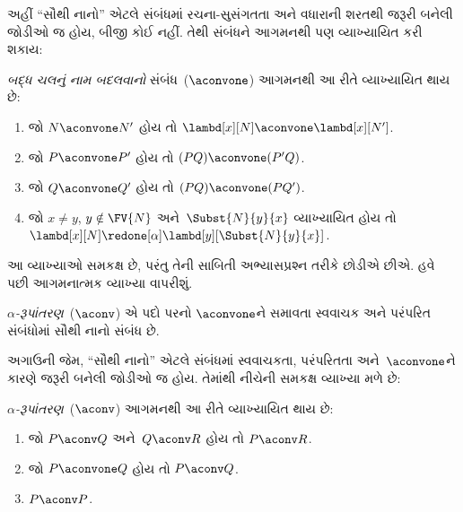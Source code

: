 અહીં ``સૌથી નાનો'' એટલે સંબંધમાં રચના-સુસંગતતા અને વધારાની
શરતથી જરૂરી બનેલી જોડીઓ જ હોય, બીજી કોઈ નહીં. તેથી સંબંધને
આગમનથી પણ વ્યાખ્યાયિત કરી શકાય:

\begin{defn} 
  \emph{બદ્ધ ચલનું નામ બદલવાનો} સંબંધ~($\aconvone$)
  આગમનથી આ રીતે વ્યાખ્યાયિત થાય છે:
  \begin{enumerate}
  \item જો $N \aconvone N'$ હોય તો $\lambd[x][N] \aconvone
    \lambd[x][N']$. 
  \item જો $P \aconvone P'$ હોય તો $(PQ) \aconvone (P'Q)$.
  \item જો $Q \aconvone Q'$ હોય તો $(PQ) \aconvone (PQ')$.
  \item જો $x \neq y$, $y \notin \FV{N}$ અને~$\Subst{N}{y}{x}$
    વ્યાખ્યાયિત હોય તો
    $\lambd[x][N] \redone[\alpha] \lambd[y][\Subst{N}{y}{x}]$.
  \end{enumerate}
\end{defn}

આ વ્યાખ્યાઓ સમકક્ષ છે, પરંતુ તેની સાબિતી અભ્યાસપ્રશ્ન તરીકે
છોડીએ છીએ. હવે પછી આગમનાત્મક વ્યાખ્યા વાપરીશું.

\begin{defn}
  \emph{$\alpha$-રૂપાંતરણ}~($\aconv$) એ પદો પરનો
  $\aconvone$ને સમાવતા સ્વવાચક અને પરંપરિત સંબંધોમાં
  સૌથી નાનો સંબંધ છે.
\end{defn}

અગાઉની જેમ, ``સૌથી નાનો'' એટલે સંબંધમાં સ્વવાચકતા,
પરંપરિતતા અને~$\aconvone$ને કારણે જરૂરી બનેલી જોડીઓ જ હોય.
તેમાંથી નીચેની સમકક્ષ વ્યાખ્યા મળે છે:

\begin{defn} 
  \emph{$\alpha$-રૂપાંતરણ}~($\aconv$) આગમનથી આ રીતે
  વ્યાખ્યાયિત થાય છે:
  \begin{enumerate}
  \item જો $P \aconv Q$ અને~$Q \aconv R$ હોય તો
    $P \aconv R$. 
  \item જો $P \aconvone Q$ હોય તો $P \aconv Q$.
  \item $P \aconv P$. 
  \end{enumerate}
\end{defn}

